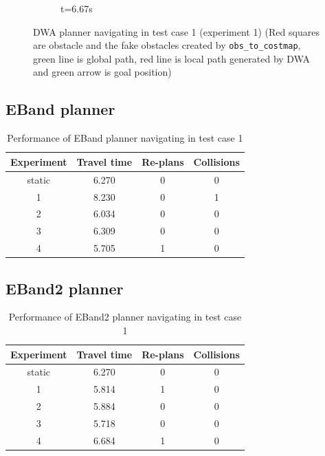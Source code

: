 \begin{figure}[ht]
\begin{subfigure}[b]{0.30\linewidth}
        \caption{t=6.67s}
    \end{subfigure}%
    \caption{DWA planner navigating in test case 1 (experiment 1) (Red squares are obstacle and the
    fake obstacles created by \texttt{obs\_to\_costmap}, green line is global path, red line is 
local path generated by DWA and green arrow is goal position)}\label{fig:dwa_test_case_exp_1}
\end{figure}

\subsection{EBand planner}%
\label{sub:eval_eband_planner}

\begin{table}[H]
    \centering
    \begin{tabular}{cccc}
        \textbf{Experiment} & \textbf{Travel time} & \textbf{Re-plans} & \textbf{Collisions} \\\toprule
        static & 6.270 & 0 & 0 \\
             1 & 8.230 & 0 & 1 \\
             2 & 6.034 & 0 & 0 \\
             3 & 6.309 & 0 & 0 \\
             4 & 5.705 & 1 & 0 \\
    \end{tabular}
    \caption{Performance of EBand planner navigating in test case 1}\label{tab:perfomance_eband_test_case_1}
\end{table}


\subsection{EBand2 planner}%
\label{sub:eval_eband2_planner}

\begin{table}[H]
    \centering
    \begin{tabular}{cccc}
        \textbf{Experiment} & \textbf{Travel time} & \textbf{Re-plans} & \textbf{Collisions} \\\toprule
        static & 6.270 & 0 & 0 \\
             1 & 5.814 & 1 & 0 \\
             2 & 5.884 & 0 & 0 \\
             3 & 5.718 & 0 & 0 \\
             4 & 6.684 & 1 & 0 \\
    \end{tabular}
    \caption{Performance of EBand2 planner navigating in test case 1}\label{tab:perfomance_eband2_test_case_1}
\end{table}

